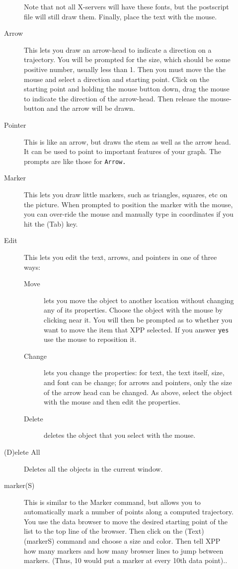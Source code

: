 \documentclass{article}
\begin{document}
\begin{description}
\begin{description}
Note that not all X-servers will have these fonts, but the
postscript file will still draw them. Finally, place the text with the
mouse.
\item[Arrow] This lets you draw an arrow-head to indicate a direction
on a trajectory.  You will be prompted for the size, which should be
some positive number, usually less than 1.  Then you must move the the
mouse and select a direction and starting point.  Click on the
starting point and holding the mouse button down, drag the mouse to
indicate the direction of the arrow-head. Then release the
mouse-button and the arrow will be drawn.  
\item[Pointer] This is like an arrow, but draws the stem as well as
the arrow head.  It can be used to point to important features of your
graph. The prompts are like those for {\tt Arrow.}
\item[Marker] This lets you draw little markers, such as triangles,
squares, etc on the picture. When prompted to position the marker with
the mouse, you can over-ride the mouse and manually type in
coordinates if you hit the (Tab) key.
\item[Edit] This lets you edit the text, arrows, and pointers in one of
three ways:
\begin{description}
\item[Move] lets you move the object to another location without
changing any of its properties.  Choose the object with the mouse by
clicking near it.
You will then be prompted as to whether you want to move the item that
XPP selected.  If you answer {\tt yes} use the mouse to reposition it.
\item[Change] lets you change the properties: for text, the text
itself, size, and font can be change; for arrows and pointers, only
the size of the arrow head can be changed. As above, select the object
with the mouse and then edit the properties.
\item[Delete] deletes the object that you select with the mouse.
\end{description}
\item[(D)elete All] Deletes all the objects in the current window.
\item[marker(S)] This is similar to the Marker command, but allows you to
automatically mark a number of points along a computed trajectory. You
use the data browser to move the desired starting point of the list to
the top line of the browser. Then click on the (Text) (markerS)
command and choose a size and color. Then tell XPP how many markers
and how many browser lines to jump between markers. (Thus, 10 would
put a marker at every 10th data point).. 




\end{description}
\end{description}
\end{document}
